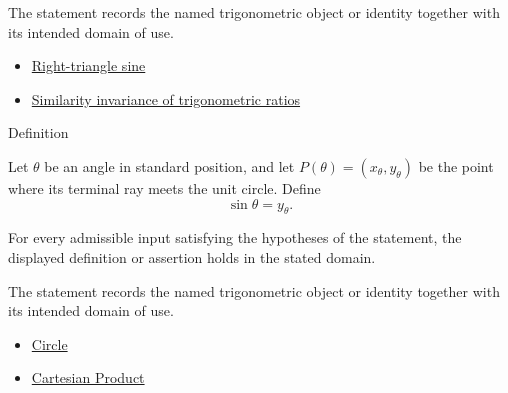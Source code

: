 \begin{remark*}[Interpretation]
The statement records the named trigonometric object or identity together with
its intended domain of use.
\end{remark*}

\begin{dependencies}
\begin{itemize}
  \item \hyperref[def:right-triangle-sine]{Right-triangle sine}
  \item \hyperref[thm:trig-ratios-similarity-invariant]{Similarity invariance of trigonometric ratios}
\end{itemize}
\end{dependencies}



\begin{definitionbox}{Definition}
\begin{definition}
\label{def:unit-circle-sine}
Let $\theta$ be an angle in standard position, and let $P(\theta)=(x_\theta,
y_\theta)$ be the point where its terminal ray meets the unit circle. Define
\[
  \sin\theta=y_\theta.
\]
\end{definition}
\end{definitionbox}
\begin{remark*}
For every admissible input satisfying the hypotheses of the statement, the
displayed definition or assertion holds in the stated domain.
\end{remark*}

\begin{remark*}[Interpretation]
The statement records the named trigonometric object or identity together with
its intended domain of use.
\end{remark*}

\begin{dependencies}
\begin{itemize}
  \item \hyperref[def:euclid-circle]{Circle}
  \item \hyperref[def:cartesian-product]{Cartesian Product}
\end{itemize}
\end{dependencies}
